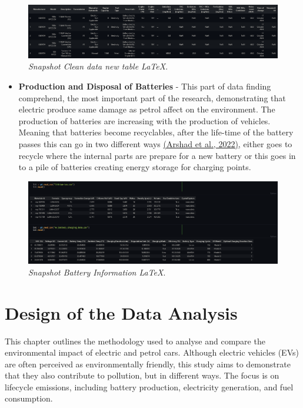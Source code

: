  \begin{figure}[H]
    \centering
    \includegraphics[scale=0.38]{figures/Vehicle Emissions.png}
    \caption{\textit{Snapshot Clean data new table \LaTeX}.}
    \label{fig:chart_1}
\end{figure}
\begin{itemize}
    \item \textbf{Production and Disposal of Batteries} - This part of data finding comprehend, the most important part of the research, demonstrating that electric produce same damage as petrol affect on the environment. The production of batteries are increasing with the production of vehicles. Meaning that batteries become recyclables, after the life-time of the battery passes this can go in two different ways \href{https://www.sciencedirect.com/science/article/pii/S092134492200012X}{(Arshad et al., 2022)}, either goes to recycle where the internal parts are prepare for a new battery or this goes in to a pile of batteries creating energy storage for charging points.
\end{itemize}

 \begin{figure}[H]
    \centering
    \includegraphics[scale=0.38]{figures/BatteryInfo.png}
    \caption{\textit{Snapshot Battery Information \LaTeX}.}
    \label{fig:chart_2}
\end{figure}


\section{Design of the Data Analysis}
This chapter outlines the methodology used to analyse and compare the environmental impact of electric and petrol cars.
 Although electric vehicles (EVs) are often perceived as environmentally friendly,
 this study aims to demonstrate that they also contribute to pollution, but in different ways.
 The focus is on lifecycle emissions, including battery production, electricity generation, and fuel consumption.\\ 

